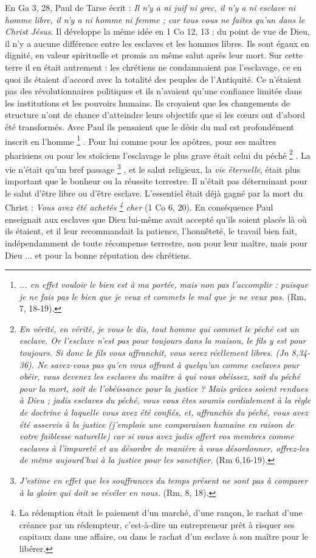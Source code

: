  
 En Ga 3, 28, Paul de Tarse écrit : \emph{Il n'y a ni juif ni grec, il n'y a ni esclave ni homme libre, il n'y a ni homme ni femme ; car tous vous ne faites qu'un dans le Christ Jésus}. Il développe la même idée en 1 Co 12, 13 : du point de vue de Dieu, il n'y a aucune différence entre les esclaves et les hommes libres. Ils sont égaux en dignité, en valeur spirituelle et promis au même salut après leur mort. Sur cette terre il en était autrement : les chrétiens ne condamnaient pas l'esclavage, ce en quoi ils étaient d'accord avec la totalité des peuples de l'Antiquité. Ce n'étaient pas des révolutionnaires politiques et ils n'avaient qu'une confiance limitée dans les institutions et les pouvoirs humains. Ils croyaient que les changements de structure n'ont de chance d'atteindre leurs objectifs que si les cœurs ont d'abord été transformés. Avec Paul ils pensaient que le désir du mal est profondément inscrit en l'homme
\footnote{\emph{... en effet vouloir le bien est à ma portée, mais non pas l'accomplir : puisque je ne fais pas le bien que je veux et commets le mal que je ne veux pas.} (Rm, 7, 18-19).}
. Pour lui comme pour les apôtres, pour ses maîtres pharisiens ou pour les stoïciens l'esclavage le plus grave était celui du péché%
\footnote{\emph{En vérité, en vérité, je vous le dis, tout homme qui commet le péché est un esclave. Or l'esclave n'est pas pour toujours dans la maison, le fils y est pour toujours. Si donc le fils vous affranchit, vous serez réellement libres. \emph{(Jn 8,34-36).} Ne savez-vous pas qu'en vous offrant à quelqu'un comme esclaves pour obéir, vous devenez les esclaves du maître à qui vous obéissez, soit du péché pour la mort, soit de l'obéissance pour la justice ? Mais grâces soient rendues à Dieu ; jadis esclaves du péché, vous vous êtes soumis cordialement à la règle de doctrine à laquelle vous avez été confiés, et, affranchis du péché, vous avez été asservis à la justice (j'emploie une comparaison humaine en raison de votre faiblesse naturelle) car si vous avez jadis offert vos membres comme esclaves à l'impureté et au désordre de manière à vous désordonner, offrez-les de même aujourd'hui à la justice pour les sanctifier.} (Rm 6,16-19).}
. La vie n'était qu'un bref passage
\footnote{\emph{J'estime en effet que les souffrances du temps présent ne sont pas à comparer à la gloire qui doit se révéler en nous.} (Rm, 8, 18).}%
, et le salut religieux, la \emph{vie éternelle}, était plus important que le bonheur ou la réussite terrestre. Il n'était pas déterminant pour le salut d'être libre ou d'être esclave. L'essentiel était déjà gagné par la mort du Christ : \emph{Vous avez été achetés%
\footnote{La rédemption était le paiement d'un marché, d'une rançon, le rachat d'une créance par un rédempteur, c'est-à-dire un entrepreneur prêt à risquer ses capitaux dans une affaire, ou dans le rachat d'un esclave à son maître pour le libérer.} 
cher} (1 Co 6, 20). En conséquence Paul enseignait aux esclaves que Dieu lui-même avait accepté qu'ils soient placés là où ils étaient, et il leur recommandait la patience, l'honnêteté, le travail bien fait, indépendamment de toute récompense terrestre, non pour leur maître, mais pour Dieu ... et pour la bonne réputation des chrétiens. 

